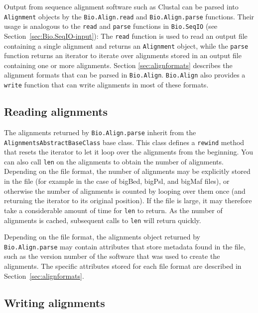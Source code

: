 Output from sequence alignment software such as Clustal can be parsed into \verb|Alignment| objects by the \verb|Bio.Align.read| and \verb|Bio.Align.parse| functions. Their usage is analogous to the \verb|read| and \verb|parse| functions in \verb|Bio.SeqIO| (see Section~\ref{sec:Bio.SeqIO-input}): The \verb|read| function is used to read an output file containing a single alignment and returns an \verb|Alignment| object, while the \verb|parse| function returns an iterator to iterate over alignments stored in an output file containing one or more alignments. Section \ref{sec:alignformats} describes  the alignment formats that can be parsed in \verb|Bio.Align|.  \verb|Bio.Align| also provides a \verb|write| function that can write alignments in most of these formats.

\subsection{Reading alignments}

The alignments returned by \verb|Bio.Align.parse| inherit from the \verb|AlignmentsAbstractBaseClass| base class. This class defines a \verb|rewind| method that resets the iterator to let it loop over the alignments from the beginning. You can also call \verb|len| on the alignments to obtain the number of alignments. Depending on the file format, the number of alignments may be explicitly stored in the file (for example in the case of bigBed, bigPsl, and bigMaf files), or otherwise the number of alignments is counted by looping over them once (and returning the iterator to its original position). If the file is large, it may therefore take a considerable amount of time for \verb|len| to return. As the number of alignments is cached, subsequent calls to \verb|len| will return quickly.

Depending on the file format, the alignments object returned by \verb|Bio.Align.parse| may contain attributes that store metadata found in the file, such as the version number of the software that was used to create the alignments. The specific attributes stored for each file format are described in Section~\ref{sec:alignformats}.

\subsection{Writing alignments}
\label{subsec:align_writing}

